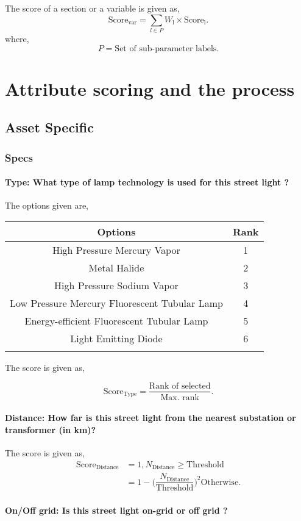 \documentclass[oneside,twocolumn]{article}
\newcommand{\tsub}[2]{\text{#1}_{\text{#2}}}
\newcommand{\tsubb}[2]{#1_{\text{#2}}}
\newcommand{\dsub}[2]{\dfrac{\text{#1}}{\text{#2}}}
\newcommand{\singsel}[1]
{
	\[
		\tsub{Score}{#1} = \dsub{Rank of selected}{Max. rank}.
	\]
}
\newenvironment{ttable}
{
\begin{center}
\begin{tabular}{c|c}
\hline
}
{
\\ \hline
\end{tabular}
\end{center}
}
\begin{document}
The score of a section or a variable is given as,
\[
	\tsub{Score}{var} = \sum_{l \in P} \tsubb{W}{l} \times \tsub{Score}{l}.
\]
where,
\[
	P = \text{Set of sub-parameter labels.}
\]
\section{Attribute scoring and the
process}
\subsection{Asset Specific}
\subsubsection{Specs}

\paragraph{Type: What type of lamp technology is used for this street light ?}

The options given are,
\begin{ttable}
Options & Rank \\ \hline
High Pressure Mercury Vapor & 1 \\
Metal Halide   & 2 \\
High Pressure Sodium
Vapor  & 3 \\
Low Pressure Mercury
Fluorescent Tubular
Lamp & 4 \\
Energy-efficient
Fluorescent Tubular
Lamp  & 5 \\
Light Emitting Diode & 6 \\
\hline
\end{ttable}
The score is given as,
\singsel{Type}
\paragraph{Distance: How far is this street light from the nearest substation or transformer (in km)?}

The score is given as,
\begin{align*}
\tsub{Score}{Distance} &= 1, \tsubb{N}{Distance} \ge \text{Threshold} \\
        &=
1 - \Big(\dfrac{\tsubb{N}{Distance}}{\text{Threshold}}\Big)^{2}
\text{Otherwise}.
\end{align*}
\paragraph{On/Off grid: Is this street light on-grid or off grid ?}
\end{document}

